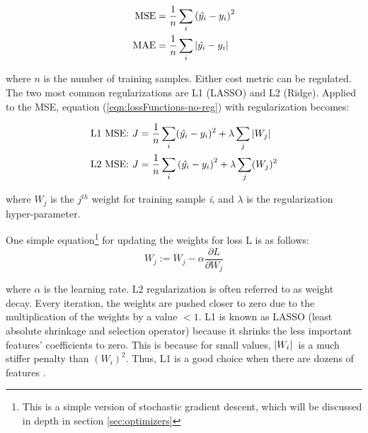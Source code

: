 \begin{align}
    \label{eqn:lossFunctions-no-reg}
    \text{MSE} &= \frac{1}{n} \sum_i \left( \hat{y_i} - y_i \right)^2\\
    \text{MAE} &= \frac{1}{n} \sum_i \abs*{\hat{y_i} - y_i}
\end{align}

\noindent where $ n $ is the number of training samples. Either cost metric can be regulated. The two most common regularizations are L1 (LASSO) and L2 (Ridge). Applied to the MSE, equation (\ref{eqn:lossFunctions-no-reg}) with regularization becomes: 

\begin{align}
    \label{eqn:lossFunctions}
    \text{L1 MSE: } J &= \frac{1}{n} \sum_i (\hat{y_i} - y_i)^2 + \lambda \sum_j \abs*{W_j}\\
    \text{L2 MSE: } J &= \frac{1}{n} \sum_i \left( \hat{y_i} - y_i \right)^2 + \lambda \sum_j (W_j)^2
\end{align}

\noindent where $ W_j $ is the $ j^{th} $ weight for training sample \textit{i}, and $\lambda$ is the regularization hyper-parameter. 

One simple equation\footnote{This is a simple version of stochastic gradient descent, which will be discussed in depth in section \ref{sec:optimizers} } for updating the weights for loss L is as follows:
\begin{equation}
    W_j := W_j - \alpha \frac{\partial L}{\partial W_j}
\end{equation}

\noindent where $\alpha$ is the learning rate. L2 regularization is often referred to as weight decay. Every iteration, the weights are pushed closer to zero due to the multiplication of the weights by a value $<1$. L1 is known as LASSO (least absolute shrinkage and selection operator) because it shrinks the less important features' coefficients to zero. This is because for small values, $\abs*{W_i}$ is a much stiffer penalty than $(W_i)^2$. Thus, L1 is a good choice when there are dozens of features \cite{nn-regularization}. 



